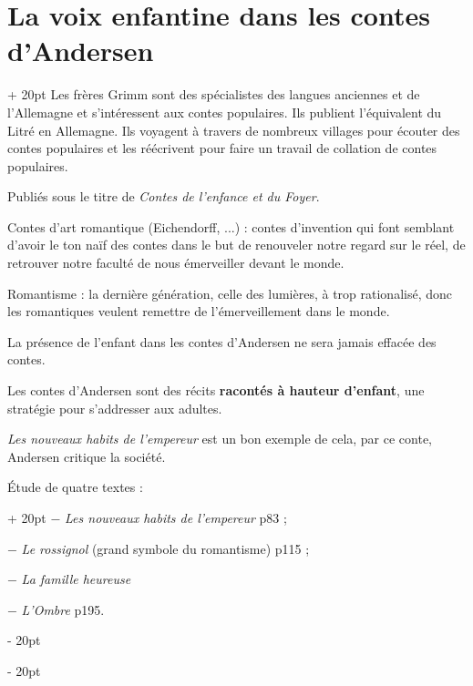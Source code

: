 \documentclass[a4paper, 12pt, twoside]{article}
\newcommand{\ind}[1][20pt]{\advance\leftskip + #1}
\newcommand{\deind}[1][20pt]{\advance\leftskip - #1}
\newenvironment{indt}[2][20pt]{#2 \par \ind[#1]}{\par \deind} %
\begin{document}
\begin{indt}{\section{La voix enfantine dans les contes d'Andersen}}
        Les frères Grimm sont des spécialistes des langues anciennes et de l'Allemagne et s'intéressent aux contes populaires. Ils publient l'équivalent du Litré en Allemagne. Ils voyagent à travers de nombreux villages pour écouter des contes populaires et les réécrivent pour faire un travail de collation de contes populaires.
        
        Publiés sous le titre de \textit{Contes de l'enfance et du Foyer}.
        
        \vspace{12pt}
        
        Contes d'art romantique (Eichendorff, ...) : contes d'invention qui font semblant d'avoir le ton naïf des contes dans le but de renouveler notre regard sur le réel, de retrouver notre faculté de nous émerveiller devant le monde.
        
        Romantisme : la dernière génération, celle des lumières, à trop rationalisé, donc les romantiques veulent remettre de l'émerveillement dans le monde.
        
        La présence de l'enfant dans les contes d'Andersen ne sera jamais effacée des contes.
        
        Les contes d'Andersen sont des récits \textbf{racontés à hauteur d'enfant}, une stratégie pour s'addresser aux adultes.
        
        \textit{Les nouveaux habits de l'empereur} est un bon exemple de cela, par ce conte, Andersen critique la société.
        
        \vspace{12pt}
        
        \begin{indt}{\'Etude de quatre textes :}
            $-$ \textit{Les nouveaux habits de l'empereur} p83 ;
            
            $-$ \textit{Le rossignol} (grand symbole du romantisme) p115 ;
            
            $-$ \textit{La famille heureuse}
            
            $-$ \textit{L'Ombre} p195.
        \end{indt}
        
    \end{indt}

    
    
    
\end{document}
